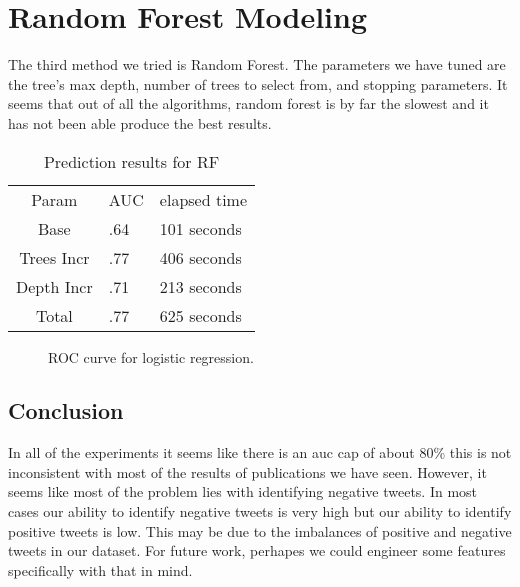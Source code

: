 \documentclass[twocolumn,11pt]{asme2ej}
\begin{document}
\section{Random Forest Modeling}

The third method we tried is Random Forest. The parameters we have tuned are the tree's max depth, number of trees to select from, and stopping parameters. It seems that out of all the algorithms, random forest is by far the slowest and it has not been able produce the best results. 

\begin{table}[t]
\caption{Prediction results for RF}
\begin{center}
\label{table_ASME}
\begin{tabular}{c l l}
& &\\ %
\hline
Param & AUC & elapsed time\\
\hline
Base & .64 & 101 seconds \\
Trees Incr &  .77 & 406 seconds \\
Depth Incr & .71 &  213 seconds \\
Total & .77 & 625 seconds \\
\hline
\end{tabular}
\end{center}
\end{table}

\begin{figure}
\centerline{}
\caption{ROC curve for logistic regression.}
\label{model}
\end{figure}

\subsection{Conclusion}

In all of the experiments it seems like there is an auc cap of about 80\% this is not inconsistent with most of the results of publications we have seen. However, it seems like most of the problem lies with identifying negative tweets. In most cases our ability to identify negative tweets is very high but our ability to identify positive tweets is low. This may be due to the imbalances of positive and negative tweets in our dataset. For future work, perhapes we could engineer some features specifically with that in mind.



\end{document}
